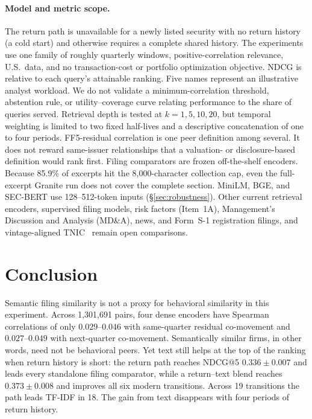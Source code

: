 \documentclass[sigconf,anonymous]{acmart}
\begin{document}
\paragraph{Model and metric scope.}
The return path is unavailable for a newly listed security with no return
history (a cold start) and otherwise requires a complete shared history.  The
experiments use one family of roughly quarterly windows, positive-correlation
relevance, U.S.\ data, and no transaction-cost or portfolio optimization
objective.  NDCG is relative to each query's attainable ranking.  Five names
represent an illustrative analyst workload.  We do not validate a minimum-correlation
threshold, abstention rule, or utility--coverage
curve relating performance to the share of queries served.
Retrieval depth is tested at $k=1,5,10,20$, but
temporal weighting is limited to two fixed half-lives and a descriptive
concatenation of one to four periods.
FF5-residual correlation is one peer definition among several.  It does not
reward same-issuer relationships that a valuation- or disclosure-based
definition would rank first.  Filing comparators are frozen off-the-shelf
encoders.  Because 85.9\% of excerpts hit the 8,000-character collection cap,
even the full-excerpt Granite run does not cover the complete section.  MiniLM, BGE, and
SEC-BERT use 128--512-token inputs (\S\ref{sec:robustness}).  Other current
retrieval encoders, supervised filing models, risk factors (Item~1A),
Management's Discussion and Analysis (MD\&A), news, and Form~S-1 registration filings,
and vintage-aligned
TNIC~\citep{hoberg2016text} remain open comparisons.

\section{Conclusion}
\label{sec:conclusion}

Semantic filing similarity is not a proxy for behavioral similarity in this
experiment.  Across 1,301,691 pairs, four dense encoders have Spearman
correlations of only $0.029$--$0.046$ with same-quarter residual co-movement and
$0.027$--$0.049$ with next-quarter co-movement.  Semantically similar firms, in
other words, need not be behavioral peers.  Yet text still helps at the top of
the ranking when return history is short: the return path reaches NDCG@5
$0.336\pm0.007$ and leads every standalone filing comparator, while a
return--text blend reaches $0.373\pm0.008$ and improves all six modern
transitions.  Across 19 transitions the path leads TF-IDF in 18.  The gain from
text disappears with four periods of return history.
\end{document}
